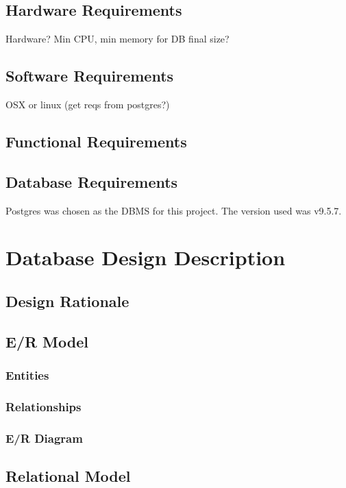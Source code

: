 \documentclass[a4paper,11pt]{article}
\begin{document}
\subsection{Hardware Requirements}
Hardware?  Min CPU, min memory for DB final size?

\subsection{Software Requirements}
OSX or linux (get reqs from postgres?)
\subsection{Functional Requirements}
\subsection{Database Requirements}
Postgres was chosen as the DBMS for this project.  The version used was v9.5.7.

\section{Database Design Description}

\subsection{Design Rationale}


\subsection{E/R Model}

\subsubsection{Entities}
\subsubsection{Relationships}
\subsubsection{E/R Diagram}

\subsection{Relational Model}
\end{document}
